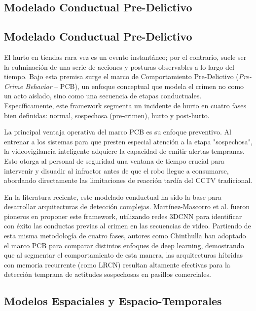 \subsection{Modelado Conductual Pre-Delictivo}

  \subsection{Modelado Conductual Pre-Delictivo}

El hurto en tiendas rara vez es un evento instantáneo; por el contrario, suele ser la culminación de una serie de acciones y posturas observables a lo largo del tiempo. Bajo esta premisa surge el marco de Comportamiento Pre-Delictivo (\textit{Pre-Crime Behavior} -- PCB), un enfoque conceptual que modela el crimen no como un acto aislado, sino como una secuencia de etapas conductuales. Específicamente, este framework segmenta un incidente de hurto en cuatro fases bien definidas: normal, sospechosa (pre-crimen), hurto y post-hurto.

La principal ventaja operativa del marco PCB es su enfoque preventivo. Al entrenar a los sistemas para que presten especial atención a la etapa "sospechosa", la videovigilancia inteligente adquiere la capacidad de emitir alertas tempranas. Esto otorga al personal de seguridad una ventana de tiempo crucial para intervenir y disuadir al infractor antes de que el robo llegue a consumarse, abordando directamente las limitaciones de reacción tardía del CCTV tradicional.

En la literatura reciente, este modelado conductual ha sido la base para desarrollar arquitecturas de detección complejas. Martínez-Mascorro et al. \cite{martinez-mascorro_suspicious_2021} fueron pioneros en proponer este framework, utilizando redes 3DCNN para identificar con éxito las conductas previas al crimen en las secuencias de video. Partiendo de esta misma metodología de cuatro fases, autores como Chinthulla \cite{chinthulla_deep_2025} han adoptado el marco PCB para comparar distintos enfoques de deep learning, demostrando que al segmentar el comportamiento de esta manera, las arquitecturas híbridas con memoria recurrente (como LRCN) resultan altamente efectivas para la detección temprana de actitudes sospechosas en pasillos comerciales.

\subsection{Modelos Espaciales y Espacio-Temporales}


